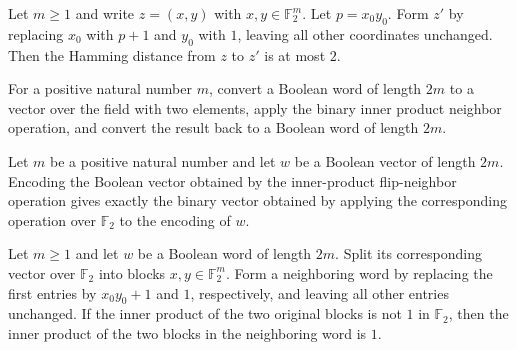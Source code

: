 \begin{theorem}
\label{FABL.hammingDist_innerProductFlipNeighborBinary_le_two}
\leanok
{}
Let $m\ge 1$ and write $z=(x,y)$ with $x,y\in\mathbb F_2^m$. Let $p=x_0y_0$. Form $z'$
by replacing $x_0$ with $p+1$ and $y_0$ with $1$, leaving all other coordinates
unchanged. Then the Hamming distance from $z$ to $z'$ is at most $2$.
\end{theorem}

\begin{definition}
\label{FABL.innerProductFlipNeighbor}
\leanok
{}
For a positive natural number $m$, convert a Boolean word of length $2m$ to a vector
over the field with two elements, apply the binary inner product neighbor operation, and
convert the result back to a Boolean word of length $2m$.
\end{definition}

\begin{theorem}
\label{FABL.pcppBoolCubeEquiv_innerProductFlipNeighbor}
\leanok
{}
Let $m$ be a positive natural number and let $w$ be a Boolean vector of length $2m$.
Encoding the Boolean vector obtained by the inner-product flip-neighbor operation gives
exactly the binary vector obtained by applying the corresponding operation over $\mathbb
F_2$ to the encoding of $w$.
\end{theorem}

\begin{theorem}
\label{FABL.innerProductFlipNeighbor_isInnerProductModTwoOne}
\leanok
{}
Let $m\ge1$ and let $w$ be a Boolean word of length $2m$. Split its corresponding vector
over $\mathbb F_2$ into blocks $x,y\in\mathbb F_2^m$. Form a neighboring word by
replacing the first entries by $x_0y_0+1$ and $1$, respectively, and leaving all other
entries unchanged. If the inner product of the two original blocks is not $1$ in
$\mathbb F_2$, then the inner product of the two blocks in the neighboring word is $1$.
\end{theorem}

